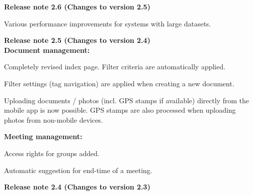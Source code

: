 \vspace{\baselineskip}
\textbf{Release note 2.6 (Changes to version 2.5)} \\
\begin{compactitem}
  \item Various performance improvements for systems with large datasets.
\end{compactitem}

\vspace{\baselineskip}

\textbf{Release note 2.5 (Changes to version 2.4)} \\
\textbf{Document management:}
\begin{compactitem}
  \item Completely revised index page. Filter criteria are automatically applied.
	\item Filter settings (tag navigation) are applied when creating a new document.
	\item Uploading documents / photos (incl. GPS stamps if available) directly from the mobile app is now possible. GPS stamps are also processed when uploading photos from non-mobile devices.
\end{compactitem}
\textbf{Meeting management:}
\begin{compactitem}
  \item Access rights for groups added.
	\item Automatic suggestion for end-time of a meeting.
\end{compactitem}

\vspace{\baselineskip}

\textbf{Release note 2.4 (Changes to version 2.3)} \\

